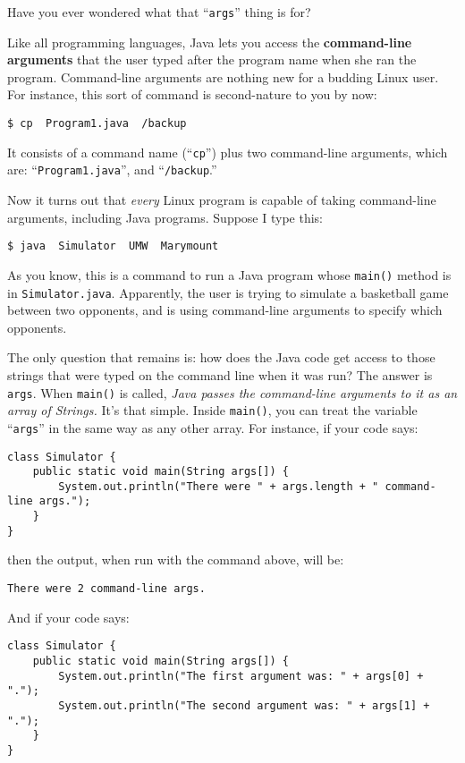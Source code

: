 Have you ever wondered what that ``\texttt{args}'' thing is for?

Like all programming languages, Java lets you access the \textbf{command-line
arguments} that the user typed after the program name when she ran the
program. Command-line arguments are nothing new for a budding Linux user. For
instance, this sort of command is second-nature to you by now:

\medskip
\quad \texttt{\$ cp \ Program1.java \ \freakingtilde/backup }
\medskip

It consists of a command name (``\texttt{cp}'') plus two command-line
arguments, which are: ``\texttt{Program1.java}'', and
``\texttt{\freakingtilde/backup}.''

Now it turns out that \textit{every} Linux program is capable of taking
command-line arguments, including Java programs. Suppose I type this:

\medskip
\quad \texttt{\$ java \ Simulator \ UMW \ Marymount}
\medskip

As you know, this is a command to run a Java program whose \texttt{main()}
method is in \texttt{Simulator.java}. Apparently, the user is trying to
simulate a basketball game between two opponents, and is using command-line
arguments to specify which opponents. 

The only question that remains is: how does the Java code get access to those
strings that were typed on the command line when it was run? The answer is
\texttt{args}. When \texttt{main()} is called, \textit{Java passes the
command-line arguments to it as an array of Strings.} It's that simple. Inside
\texttt{main()}, you can treat the variable ``\texttt{args}'' in the same way
as any other array. For instance, if your code says:

\begin{Verbatim}[fontsize=\footnotesize,samepage=true,frame=single]
class Simulator {
    public static void main(String args[]) {
        System.out.println("There were " + args.length + " command-line args.");
    }
}
\end{Verbatim}

then the output, when run with the command above, will be:

\medskip
\quad \texttt{There were 2 command-line args.}
\medskip

And if your code says:

\begin{Verbatim}[fontsize=\footnotesize,samepage=true,frame=single]
class Simulator {
    public static void main(String args[]) {
        System.out.println("The first argument was: " + args[0] + ".");
        System.out.println("The second argument was: " + args[1] + ".");
    }
}
\end{Verbatim}

